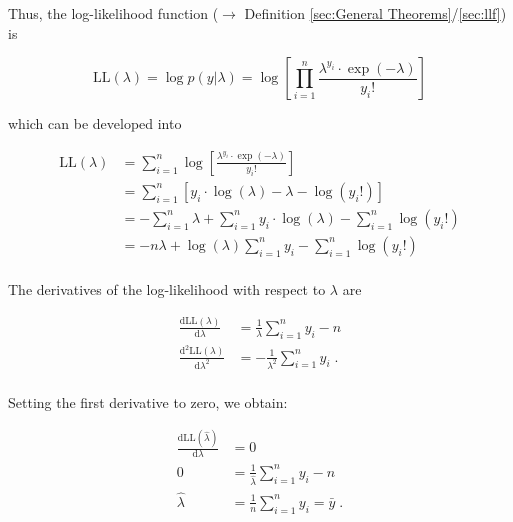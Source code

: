 \documentclass[a4paper,12pt,twoside]{book}
\begin{document}
Thus, the log-likelihood function ($\rightarrow$ Definition \ref{sec:General Theorems}/\ref{sec:llf}) is

\begin{equation} \label{eq:poiss-mle-Poiss-LL}
\mathrm{LL}(\lambda) = \log p(y|\lambda) = \log \left[ \prod_{i=1}^n \frac{\lambda^{y_i} \cdot \exp(-\lambda)}{y_i !} \right]
\end{equation}

which can be developed into

\begin{equation} \label{eq:poiss-mle-Poiss-LL-der}
\begin{split}
\mathrm{LL}(\lambda) &= \sum_{i=1}^n \log \left[ \frac{\lambda^{y_i} \cdot \exp(-\lambda)}{y_i !} \right] \\
&= \sum_{i=1}^n \left[ y_i \cdot \log(\lambda) - \lambda - \log(y_i !) \right] \\
&= - \sum_{i=1}^n \lambda + \sum_{i=1}^n y_i \cdot \log(\lambda) - \sum_{i=1}^n \log(y_i !) \\
&= - n \lambda + \log(\lambda) \sum_{i=1}^n y_i - \sum_{i=1}^n \log(y_i !) \\
\end{split}
\end{equation}

The derivatives of the log-likelihood with respect to $\lambda$ are

\begin{equation} \label{eq:poiss-mle-Poiss-dLLdl-d2LLdl2}
\begin{split}
\frac{\mathrm{d}\mathrm{LL}(\lambda)}{\mathrm{d}\lambda} &= \frac{1}{\lambda} \sum_{i=1}^n y_i - n \\
\frac{\mathrm{d}^2\mathrm{LL}(\lambda)}{\mathrm{d}\lambda^2} &= -\frac{1}{\lambda^2} \sum_{i=1}^n y_i \; . \\
\end{split}
\end{equation}

Setting the first derivative to zero, we obtain:

\begin{equation} \label{eq:poiss-mle-Poiss-dLLdl}
\begin{split}
\frac{\mathrm{d}\mathrm{LL}(\hat{\lambda})}{\mathrm{d}\lambda} &= 0 \\
0 &= \frac{1}{\hat{\lambda}} \sum_{i=1}^n y_i - n \\
\hat{\lambda} &= \frac{1}{n} \sum_{i=1}^n y_i = \bar{y} \; .
\end{split}
\end{equation}
\end{document}
